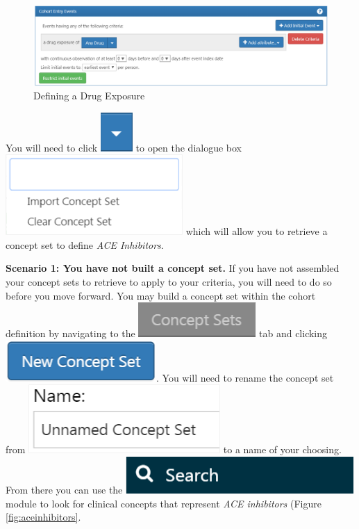 \documentclass[11pt]{book}
\theoremstyle{definition}
\theoremstyle{definition}
\theoremstyle{definition}
\theoremstyle{remark}
\begin{document}
\begin{figure}

{\centering \includegraphics[width=0.5\linewidth]{images/Cohorts/ATLAS-drugexposure} 

}

\caption{Defining a Drug Exposure}\label{fig:ATLASdrugexposure}
\end{figure}

You will need to click \includegraphics{images/Cohorts/downarrow.png} to open the dialogue box \includegraphics{images/Cohorts/importaconcept.png} which will allow you to retrieve a concept set to define \emph{ACE Inhibitors}.

\textbf{Scenario 1: You have not built a concept set.} If you have not assembled your concept sets to retrieve to apply to your criteria, you will need to do so before you move forward. You may build a concept set within the cohort definition by navigating to the \includegraphics{images/Cohorts/nested-conceptset.png} tab and clicking \includegraphics{images/Cohorts/newconceptset.png}. You will need to rename the concept set from \includegraphics{images/Cohorts/unnamed.png} to a name of your choosing. From there you can use the \includegraphics{images/Cohorts/search-2.png} module to look for clinical concepts that represent \emph{ACE inhibitors} (Figure \ref{fig:aceinhibitors}.
\end{document}
